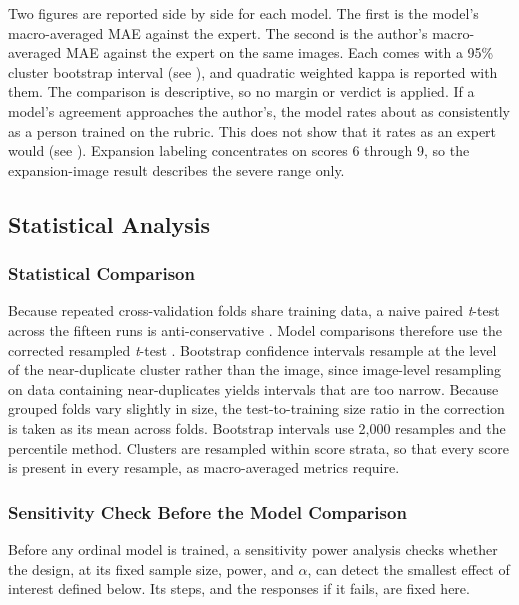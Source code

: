 \documentclass{icsthesis}
\newcommand{\secref}[1]{\textit{\nameref{#1}}}
\begin{document}
\begin{mainmatter}
					Two figures are reported side by side for each model. The first is
					the model's macro-averaged MAE against the expert. The second is the
					author's macro-averaged MAE against the expert on the same images.
					Each comes with a 95\% cluster bootstrap interval (see
					\secref{sec:stats}), and quadratic weighted kappa is reported with
					them. The comparison is descriptive, so no margin or verdict is
					applied. If a model's agreement approaches the author's, the model
					rates about as consistently as a person trained on the rubric. This
					does not show that it rates as an expert would (see
					\secref{sec:agreement}). Expansion labeling concentrates on scores 6
					through 9, so the expansion-image result describes the severe range
					only.

			\subsection{Statistical Analysis}\label{sec:statanalysis}

				\subsubsection{Statistical Comparison}\label{sec:stats}

					Because repeated cross-validation folds share training data, a naive paired
					\textit{t}-test across the fifteen runs is anti-conservative
					\citep{dietterich1998}. Model comparisons therefore use the corrected resampled
					\textit{t}-test \citep{nadeau2003}. Bootstrap confidence intervals resample at
					the level of the near-duplicate cluster rather than the image, since image-level
					resampling on data containing near-duplicates yields intervals that are too
					narrow. Because grouped folds vary slightly in size, the test-to-training size
					ratio in the correction is taken as its mean across folds. Bootstrap intervals
					use 2,000 resamples and the percentile method. Clusters are resampled within
					score strata, so that every score is present in every resample, as
					macro-averaged metrics require. 

				\subsubsection{Sensitivity Check Before the Model Comparison}\label{sec:sensitivity}

					Before any ordinal model is trained, a sensitivity power analysis
					\citep{lakens2022} checks whether the design, at its fixed sample size, power,
					and $\alpha$, can detect the smallest effect of interest defined below. Its
					steps, and the responses if it fails, are fixed here.


\end{mainmatter}
\end{document}
